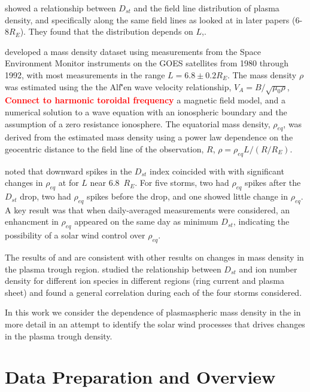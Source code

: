\documentclass[10pt,twocolumn]{article}
\newcommand{\vinote}[1]{\textcolor{red}{\textbf{#1}}} %
\newcommand{\inote}[1]{\textcolor{blue}{\textbf{#1}}} %
\def\note#1\par{\textcolor{blue}{\textbf{#1}}\\}
\begin{document}
\cite{Denton2006} showed a relationship between $D_{st}$ and the field line distribution of plasma density, and specifically along the same field lines as looked at in later papers (6-8$R_E$). They found that the distribution depends on $L$,.

\cite{Takahashi2010} developed a mass density dataset using measurements from the Space Environment Monitor instruments on the GOES satellites from 1980 through 1992, with most measurements in the range $L=6.8\pm0.2 R_E$. The mass density $\rho$ was estimated using the the Alf\v'en wave velocity relationship, $V_A=B/\sqrt{\mu_0\rho}$, \vinote{Connect to harmonic toroidal frequency} a magnetic field model, and a numerical solution to a wave equation with an ionospheric boundary and the assumption of a zero resistance ionosphere.  The equatorial mass density, $\rho_{eq}$, was derived from the estimated mass density using a power law dependence on the geocentric distance to the field line of the observation, $R$, $\rho=\rho_{eq}L/(R/R_E)$. 

\cite{Takahashi2010} noted that downward spikes in the $D_{st}$ index coincided with with significant changes in $\rho_{eq}$ at for $L$ near 6.8~$R_E$. For five storms, two had $\rho_{eq}$ spikes after the $D_{st}$ drop, two had $\rho_{eq}$ spikes before the drop, and one showed little change in $\rho_{eq}$.  A key result was that when daily-averaged measurements were considered, an enhancment in $\rho_{eq}$ appeared on the same day as minimum $D_{st}$, indicating the possibility of a solar wind control over $\rho_{eq}$.

The results of \cite{Takahashi2006} and \cite{Takahashi2010} are consistent with other results on changes in mass density in the plasma trough region.  \cite{Yao2008} studied the relationship between $D_{st}$ and ion number density for different ion species in different regions (ring current and plasma sheet) and found a general correlation during each of the four storms considered.

In this work we consider the dependence of plasmaspheric mass density in the \cite{Takahashi2010} in more detail in an attempt to identify the solar wind processes that drives changes in the plasma trough density.

\section{Data Preparation and Overview}
\end{document}
